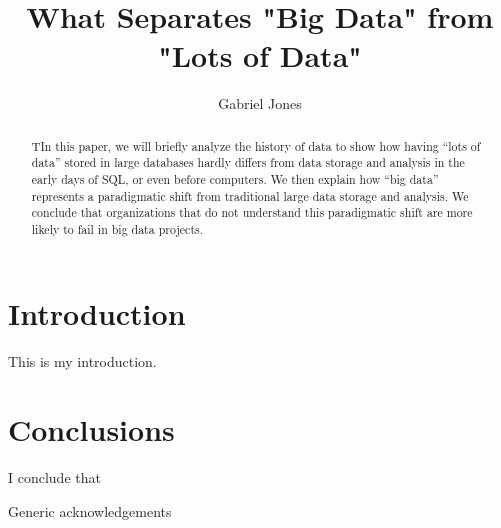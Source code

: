 \documentclass[sigconf]{acmart}
\begin{document}
\title{What Separates "Big Data" from "Lots of Data"}


\author{Gabriel Jones}

\renewcommand{\shortauthors}{G. Jones}


\begin{abstract}
TIn this paper, we will briefly analyze the history of data to show how having “lots of data” stored in large databases hardly differs from data storage and analysis in the early days of SQL, or even before computers. We then explain how “big data” represents a paradigmatic shift from traditional large data storage and analysis. We conclude that organizations that do not understand this paradigmatic shift are more likely to fail in big data projects.
\end{abstract}



\maketitle

\section{Introduction}
This is my introduction.

\section{Conclusions}
I conclude that



\begin{acks}

Generic acknowledgements

\end{acks}


 
\end{document}
